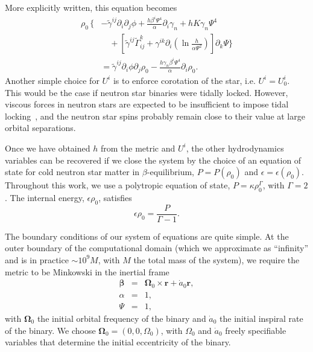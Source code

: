 \documentclass[aps,prd,amsmath,floatfix
,twocolumn
,superscriptaddress,nofootinbib,showpacs]{revtex4-1}
\theoremstyle{plain} \newtheorem{thm}{Theorem} \newtheorem{lem}{Lemma}
\begin{document}
More explicitly written, this equation becomes
\begin{align}
\rho_0\,\bigg\{\!\!&-\tilde{\gamma}^{ij}\partial_i\partial_j\phi + 
\frac{h\beta^{i}\Psi^4}{\alpha}\partial_i\gamma_n+hK\gamma_n\Psi^4
\nonumber \\
&\quad+\left[\tilde{\gamma}^{ij}\tilde{\Gamma}^k_{ij}+\gamma^{ik}\partial_i\left(\ln\frac{h}{\alpha\Psi^2}\right)\right]\partial_k\Psi 
\bigg\} \nonumber \\
&=
\tilde{\gamma}^{ij}\partial_i\phi\partial_j\rho_0-\frac{h\gamma_n\beta^i\Psi^4}{\alpha}\partial_i\rho_0. 
\label{eq:Continuity0}
\end{align}
Another simple choice for $U^i$ is to enforce corotation of the star,
i.e. $U^i=U^i_0$. This would be the case if neutron star binaries were
tidally locked.  However, viscous forces in neutron stars are expected
to be insufficient to impose tidal locking~\cite{BildstenCutler1992},
and the neutron star spins probably remain close to their value at
large orbital separations.

Once we have obtained $h$ from the metric and $U^i$, the other
hydrodynamics variables can be recovered if we close the system by the
choice of an equation of state for cold neutron star matter in
$\beta$-equilibrium, $P = P(\rho_0)$ and $\epsilon=\epsilon(\rho_0)$.
Throughout this work, we use a polytropic equation of state, $P=\kappa\rho_0^\Gamma$, with $\Gamma=2$. The internal energy, $\epsilon\rho_0$, satisfies 
\begin{equation}
\epsilon\rho_0=\frac{P}{\Gamma-1}.
\end{equation}

The boundary conditions of our system of equations are quite
simple. At the outer boundary of the computational domain (which we
approximate as ``infinity'' and is in practice $\sim 10^9M$, with $M$
the total mass of the system), we require the metric to be Minkowski
in the inertial frame
\begin{eqnarray}
{\bm \beta} &=& {\bm \Omega}_0 \times {\bm r} + \dot a_0 {\bm
  r},\\ \alpha &=& 1,\\ \Psi &=& 1,
\end{eqnarray}
with ${\bm \Omega}_0$ the initial orbital frequency of the binary and
$\dot{a}_0$ the initial inspiral rate of the binary. We choose ${\bm
  \Omega}_0=(0,0,\Omega_0)$, with $\Omega_0$ and $\dot{a}_0$ freely
specifiable variables that determine the initial eccentricity of the
binary.
\end{document}
